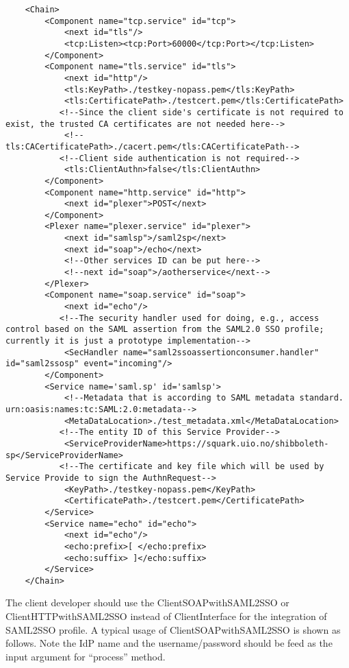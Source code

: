 \documentclass{book}
\begin{document}
\begin{verbatim}
    <Chain>
        <Component name="tcp.service" id="tcp"> 
            <next id="tls"/> 
            <tcp:Listen><tcp:Port>60000</tcp:Port></tcp:Listen> 
        </Component> 
        <Component name="tls.service" id="tls"> 
            <next id="http"/> 
            <tls:KeyPath>./testkey-nopass.pem</tls:KeyPath> 
            <tls:CertificatePath>./testcert.pem</tls:CertificatePath>
           <!--Since the client side's certificate is not required to exist, the trusted CA certificates are not needed here-->
            <!--tls:CACertificatePath>./cacert.pem</tls:CACertificatePath--> 
           <!--Client side authentication is not required-->
            <tls:ClientAuthn>false</tls:ClientAuthn> 
        </Component> 
        <Component name="http.service" id="http"> 
            <next id="plexer">POST</next> 
        </Component> 
        <Plexer name="plexer.service" id="plexer"> 
            <next id="samlsp">/saml2sp</next> 
            <next id="soap">/echo</next>
            <!--Other services ID can be put here-->
            <!--next id="soap">/aotherservice</next-->
        </Plexer> 
        <Component name="soap.service" id="soap"> 
            <next id="echo"/> 
           <!--The security handler used for doing, e.g., access control based on the SAML assertion from the SAML2.0 SSO profile; currently it is just a prototype implementation-->
            <SecHandler name="saml2ssoassertionconsumer.handler" id="saml2ssosp" event="incoming"/> 
        </Component> 
        <Service name='saml.sp' id='samlsp'>
            <!--Metadata that is according to SAML metadata standard. urn:oasis:names:tc:SAML:2.0:metadata-->
            <MetaDataLocation>./test_metadata.xml</MetaDataLocation> 
           <!--The entity ID of this Service Provider-->
            <ServiceProviderName>https://squark.uio.no/shibboleth-sp</ServiceProviderName>
           <!--The certificate and key file which will be used by Service Provide to sign the AuthnRequest-->
            <KeyPath>./testkey-nopass.pem</KeyPath> 
            <CertificatePath>./testcert.pem</CertificatePath> 
        </Service> 
        <Service name="echo" id="echo"> 
            <next id="echo"/> 
            <echo:prefix>[ </echo:prefix> 
            <echo:suffix> ]</echo:suffix> 
        </Service> 
    </Chain> 
\end{verbatim}
 
    The client developer should use the ClientSOAPwithSAML2SSO  or ClientHTTPwithSAML2SSO instead of ClientInterface for the integration of SAML2SSO profile. A typical usage of ClientSOAPwithSAML2SSO is shown as follows. Note the IdP name and the username/password should be feed as the input argument for ``process'' method.
\end{document}
